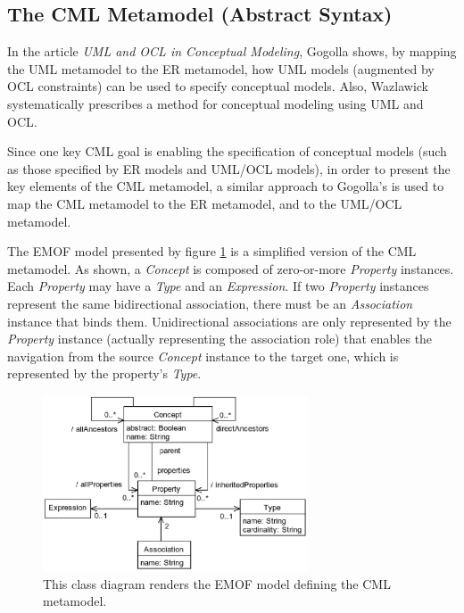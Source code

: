 \subsection{The CML Metamodel (Abstract Syntax)}\label{subsec:metamodel}

In the article \emph{UML and OCL in Conceptual Modeling},
Gogolla \cite{gogolla} shows, by mapping the UML \cite{uml} metamodel to the ER \cite{er} metamodel,
how UML models (augmented by OCL \cite{ocl} constraints) can be used to specify conceptual models.
Also, Wazlawick \cite{wazlawick} systematically prescribes a method for conceptual modeling using UML and OCL.

Since one key CML goal is enabling the specification of conceptual models
(such as those specified by ER models and UML/OCL models),
in order to present the key elements of the CML metamodel,
a similar approach to Gogolla's is used to map the CML metamodel to the ER metamodel,
and to the UML/OCL metamodel.

The EMOF \cite{mof} model presented by figure \ref{fig:metamodel} is a simplified version of the CML metamodel.
As shown, a \emph{Concept} is composed of zero-or-more \emph{Property} instances.
Each \emph{Property} may have a \emph{Type} and an \emph{Expression}.
If two \emph{Property} instances represent the same bidirectional association,
there must be an \emph{Association} instance that binds them.
Unidirectional associations are only represented by the \emph{Property} instance (actually representing the association role)
that enables the navigation from the source \emph{Concept} instance to the target one, which is represented by the property's \emph{Type}.

\begin{figure}
\centering
\includegraphics[width=0.7\textwidth]{language/diagram-metamodel}
\caption{This class diagram renders the EMOF \cite{mof} model defining the CML metamodel.}
\label{fig:metamodel}
\end{figure}

